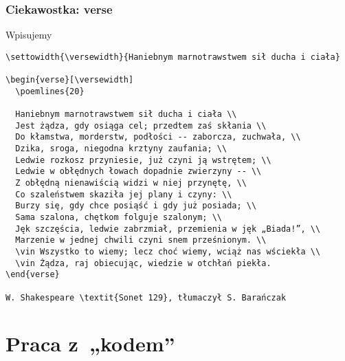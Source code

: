 \documentclass[10pt,t]{beamer}
\begin{document}
\begin{frame}[fragile]
  \frametitle{Ciekawostka: verse}

  Wpisujemy

  \begingroup

  \tiny

\begin{verbatim}
\settowidth{\versewidth}{Haniebnym marnotrawstwem sił ducha i ciała}

\begin{verse}[\versewidth]
  \poemlines{20}

  Haniebnym marnotrawstwem sił ducha i ciała \\
  Jest żądza, gdy osiąga cel; przedtem zaś skłania \\
  Do kłamstwa, morderstw, podłości -- zaborcza, zuchwała, \\
  Dzika, sroga, niegodna krztyny zaufania; \\
  Ledwie rozkosz przyniesie, już czyni ją wstrętem; \\
  Ledwie w obłędnych łowach dopadnie zwierzyny -- \\
  Z obłędną nienawiścią widzi w niej przynętę, \\
  Co szaleństwem skaziła jej plany i czyny: \\
  Burzy się, gdy chce posiąść i gdy już posiada; \\
  Sama szalona, chętkom folguje szalonym; \\
  Jęk szczęścia, ledwie zabrzmiał, przemienia w jęk „Biada!”, \\
  Marzenie w jednej chwili czyni snem prześnionym. \\
  \vin Wszystko to wiemy; lecz choć wiemy, wciąż nas wściekła \\
  \vin Żądza, raj obiecując, wiedzie w otchłań piekła.
\end{verse}

W. Shakespeare \textit{Sonet 129}, tłumaczył S. Barańczak
\end{verbatim}

  \endgroup

\end{frame}










\section{Praca z~„kodem”}
\end{document}
